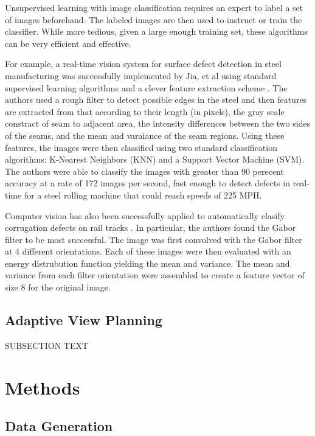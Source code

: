 \documentclass[letterpaper, 10 pt, conference]{ieeeconf}  %
\begin{document}
Unsupervised learning with image classification requires an expert to label a set of images beforehand. The labeled images are then used to instruct or train the classifier. While more tedious, given a large enough training set, these algorithms can be very efficient and effective.

For example, a real-time vision system for surface defect detection in steel manufacturing was successfully implemented by Jia, et al using standard supervised learning algorithms and a clever feature extraction scheme \cite{steelDefect}. The authors used a rough filter to detect possible edges in the steel and then features are extracted from that according to their length (in pixels), the gray scale constract of seam to adjacent area, the intensity differences between the two sides of the seams, and the mean and varaiance of the seam regions. Using these features, the images were then classified using two standard classification algorithms: K-Nearest Neighbors (KNN) and a Support Vector Machine (SVM). The authors were able to classify the images with greater than 90 perecent accuracy at a rate of 172 images per second, fast enough to detect defects in real-time for a steel rolling machine that could reach speeds of 225 MPH.

Computer vision has also been successfully applied to automatically clasify corrugation defects on rail tracks \cite{railDefect}. In particular, the authors found the Gabor filter to be most successful. The image was first convolved with the Gabor filter at 4 different orientations. Each of these images were then evaluated with an energy distrubution function yielding the mean and variance.  The mean and variance from each filter orientation were assembled to create a feature vector of size 8 for the original image.

\subsection{Adaptive View Planning}

SUBSECTION TEXT

\section{Methods}

\subsection{Data Generation}
\end{document}
